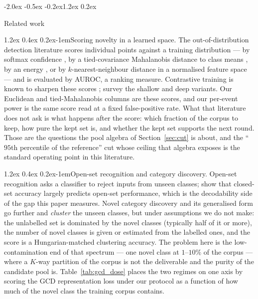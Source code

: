 \documentclass{article}
\makeatletter
\renewcommand\section{\@startsection{section}{1}{\z@}%
  {-2.0ex \@plus -0.5ex \@minus -0.2ex}{1.2ex \@plus 0.2ex}%
  {\large\bf\raggedright}}
\renewcommand\paragraph{\@startsection{paragraph}{4}{\z@}%
  {1.2ex \@plus 0.4ex \@minus 0.2ex}{-1em}{\normalsize\bf}}
\makeatother
\begin{document}
\section{Related work}
\label{sec:related}

\paragraph{Scoring novelty in a learned space.}
The out-of-distribution detection literature scores individual points
against a training distribution --- by softmax confidence
\citep{hendrycks2017baseline}, by a tied-covariance Mahalanobis distance to
class means \citep{lee2018mahalanobis}, by an energy \citep{liu2020energy},
or by $k$-nearest-neighbour distance in a normalised feature space
\citep{sun2022knn} --- and is evaluated by AUROC, a ranking measure.
Contrastive training is known to sharpen these scores
\citep{winkens2020contrastive,tack2020csi}; \citet{ruff2021unifying} survey
the shallow and deep variants. Our Euclidean and tied-Mahalanobis columns
are these scores, and our per-event power is the same score read at a fixed
false-positive rate. What that literature does not ask is what happens after
the score: which fraction of the corpus to keep, how pure the kept set is,
and whether the kept set supports the next round. Those are the questions
the pool algebra of Section~\ref{sec:cut} is about, and the ``$95$th
percentile of the reference'' cut whose ceiling that algebra exposes is the
standard operating point in this literature.

\paragraph{Open-set recognition and category discovery.}
Open-set recognition \citep{scheirer2013openset,bendale2016openmax} asks a
classifier to reject inputs from unseen classes; \citet{vaze2022openset}
show that closed-set accuracy largely predicts open-set performance, which
is the decodability side of the gap this paper measures. Novel category
discovery \citep{han2019dtc,han2020rankstats,fini2021uno} and its
generalised form \citep{cao2022orca,vaze2022gcd,wen2023simgcd} go further
and \emph{cluster} the unseen classes, but under assumptions we do not make:
the unlabelled set is dominated by the novel classes (typically half of it
or more), the number of novel classes is given or estimated from the
labelled ones, and the score is a Hungarian-matched clustering accuracy.
The problem here is the low-contamination end of that spectrum --- one novel
class at $1$--$10\%$ of the corpus --- where a $K$-way partition of the
corpus is not the deliverable and the purity of the candidate pool is.
Table~\ref{tab:gcd_dose} places the two regimes on one axis by scoring the
GCD representation loss under our protocol as a function of how much of the
novel class the training corpus contains.
\end{document}
